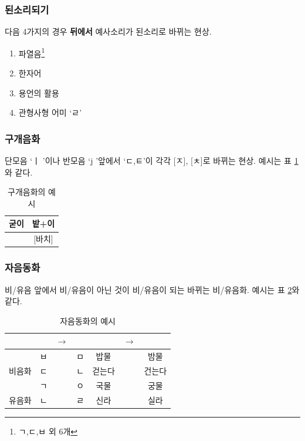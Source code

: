 \documentclass[10pt]{report}
\newcommand{\tl}{\textquoteleft}
\newcommand{\tr}{\textquoteright}
\begin{document}
\subsubsection{된소리되기}
다음 4가지의 경우 \textbf{뒤에서} 예사소리가 된소리로 바뀌는 현상.
\begin{enumerate}
\item 파열음\footnote{ㄱ,ㄷ,ㅂ 외 6개}
\item 한자어
\item 용언의 활용
\item 관형사형 어미 \tl ㄹ\tr
\end{enumerate}

\subsubsection{구개음화}
단모음 \tl ㅣ \tr 이나 반모음 \tl j \tr 앞에서 \tl ㄷ,ㅌ\tr 이 각각 [ㅈ], [ㅊ]로 바뀌는 현상. 예시는 표 \ref{palatalization}와 같다.

\begin{table}
\begin{center}
	\begin{tabular}{|c|c|}
		\hline
		굳이 & 밭+이 \\
		\hline
		[구지] & [바치] \\
		\hline
	\end{tabular}
	\caption{구개음화의 예시}
	\label{palatalization}
\end{center}
\end{table}

\subsubsection{자음동화}
비/유음 앞에서 비/유음이 아닌 것이 비/유음이 되는 바뀌는 비/유음화. 예시는 표 \ref{consonant_story}와 같다.
\begin{table}
\begin{center}
	\begin{tabular}{|c|c|c|c|c|c|c|}
		\hline
		 & & $\rightarrow$ & & & $\rightarrow$ & \\
		\hline
		\multirow{3}{*}{비음화}
		& ㅂ & & ㅁ & 밥물 & & 밤물\\
		\cline{2-7}
		& ㄷ & & ㄴ & 걷는다 & & 건는다\\
		\cline{2-7}
		& ㄱ & & ㅇ & 국물 & & 궁물\\
		\hline
		유음화 & ㄴ & & ㄹ & 신라 & & 실라\\
		\hline
	\end{tabular}
	\caption{자음동화의 예시}
	\label{consonant_story}
\end{center}
\end{table}
\end{document}
